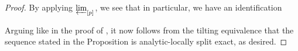 \documentclass[10pt,oneside]{amsart}
\theoremstyle{definition}
\begin{document}
\begin{proof}
		By applying $\varprojlim_{[p]}$, we see that in particular, we have an identification
		
		\begin{center}
		\end{center}
		Arguing like in the proof of \cite[Corollary III.2.19]{torsion}, it now follows from the tilting equivalence that the sequence stated in the Proposition is analytic-locally split exact, as desired.
	\end{proof}
	
	
\end{document}
